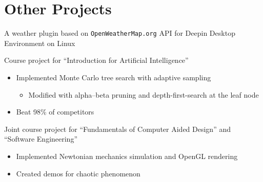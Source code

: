 \documentclass[11pt,letterpaper]{resume}
\begin{document}
\section{Other Projects}
A weather plugin based on \texttt{OpenWeatherMap.org} API for Deepin Desktop Environment on Linux\medskip

Course project for ``Introduction for Artificial Intelligence''
\begin{itemize}
    \item Implemented Monte Carlo tree search with adaptive sampling
    \begin{itemize}
        \item Modified with alpha–beta pruning and depth-first-search at 
        the leaf node
    \end{itemize}
    \item Beat 98\% of competitors
\end{itemize}\medskip

Joint course project for ``Fundamentals of Computer Aided Design'' and 
``Software Engineering''
\begin{itemize}
    \item Implemented Newtonian mechanics simulation and OpenGL rendering
    \item Created demos for chaotic phenomenon
\end{itemize}
\end{document}
